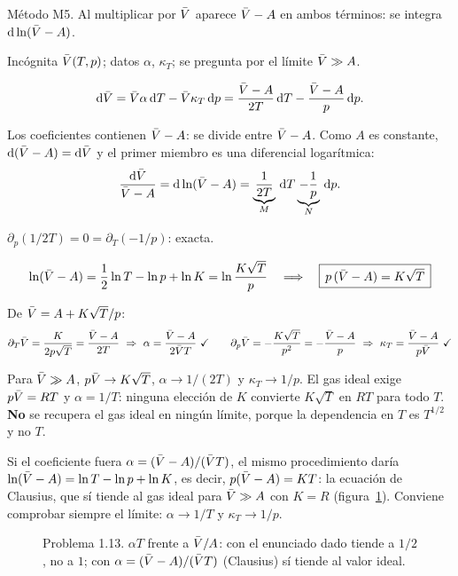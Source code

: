 \begin{resolucion}
\idea Método M5. Al multiplicar por $\bar{V}$ aparece $\bar{V}-A$ en ambos términos: se integra
$\mathrm{d}\ln(\bar{V}-A)$.

 Incógnita $\bar{V}(T,p)$; datos $\alpha$, $\kappa_T$; se pregunta por el límite
$\bar{V}\gg A$.

\[
  \mathrm{d}\bar{V}=\bar{V}\alpha\,\mathrm{d} T-\bar{V}\kappa_T\,\mathrm{d} p=\frac{\bar{V}-A}{2T}\,\mathrm{d} T-\frac{\bar{V}-A}{p}\,\mathrm{d} p.
\]

 Los coeficientes contienen $\bar{V}-A$: se divide entre $\bar{V}-A$. Como $A$ es constante,
$\mathrm{d}(\bar{V}-A)=\mathrm{d}\bar{V}$ y el primer miembro es una diferencial logarítmica:
\[
  \frac{\mathrm{d}\bar{V}}{\bar{V}-A}=\mathrm{d}\ln(\bar{V}-A)=\underbrace{\frac{1}{2T}}_{M}\,\mathrm{d} T\underbrace{-\frac1p}_{N}\,\mathrm{d} p.
\]

 $\partial_p(1/2T)=0=\partial_T(-1/p)$: exacta.

\[
  \ln(\bar{V}-A)=\frac12\ln T-\ln p+\ln K=\ln\frac{K\sqrt T}{p}
  \quad\Longrightarrow\quad\boxed{\,p\,(\bar{V}-A)=K\sqrt T\,}
\]

 De $\bar{V}=A+K\sqrt T/p$:
\[
  \partial_T\Vm=\frac{K}{2p\sqrt T}=\frac{\Vm-A}{2T}\ \Rightarrow\ \alpha=\frac{\Vm-A}{2\Vm T}\chk\qquad
  \partial_p\Vm=-\frac{K\sqrt T}{p^2}=-\frac{\Vm-A}{p}\ \Rightarrow\ \kappa_T=\frac{\Vm-A}{p\Vm}\chk
\]

 Para $\bar{V}\gg A$, $p\bar{V}\to K\sqrt T$, $\alpha\to1/(2T)$ y $\kappa_T\to1/p$. El gas ideal
exige $p\bar{V}=RT$ y $\alpha=1/T$: ninguna elección de $K$ convierte $K\sqrt T$ en $RT$ para todo $T$.
\textbf{No} se recupera el gas ideal en ningún límite, porque la dependencia en $T$ es $T^{1/2}$ y no $T$.
\end{resolucion}

\begin{observacion}
Si el coeficiente fuera $\alpha=(\bar{V}-A)/(\bar{V} T)$, el mismo procedimiento daría
$\ln(\bar{V}-A)=\ln T-\ln p+\ln K$, es decir, $p(\bar{V}-A)=KT$: la ecuación de Clausius, que sí tiende al gas
ideal para $\bar{V}\gg A$ con $K=R$ (figura~\ref{fig:p113}). Conviene comprobar siempre el límite:
$\alpha\to1/T$ y $\kappa_T\to1/p$.
\end{observacion}

\begin{figure}[htbp]
\centering
{}
\caption{Problema 1.13. $\alpha T$ frente a $\bar{V}/A$: con el enunciado dado tiende a $1/2$, no a $1$; con
$\alpha=(\bar{V}-A)/(\bar{V} T)$ (Clausius) sí tiende al valor ideal.}
\label{fig:p113}
\end{figure}

